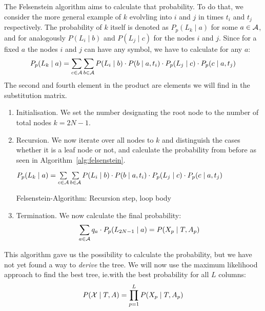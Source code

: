 The Felsenstein algorithm aims to calculate that probability.  To do that, we
consider the more general example of \(k\) evolvling into \(i\) and \(j\) in
times \(t_i\) and \(t_j\) respectively.  The probability of \(k\) itself is
denoted as \(P_p(L_k \mid a)\) for some \(a\in\mathcal{A}\), and for analogously
\(P(L_i \mid b)\) and \(P(L_j \mid c)\) for the nodes \(i\) and \(j\).  Since
for a fixed \(a\) the nodes \(i\) and \(j\) can have any symbol, we have to
calculate for any \(a\):
\[
  P_p(L_k \mid a) = \sum_{c\in\mathcal{A}} \sum_{b\in\mathcal{A}}
      P(L_i \mid b) \cdot P(b \mid a, t_i) \cdot P_p(L_j \mid c) \cdot P_p(c \mid a, t_j)
\]
The second and fourth element in the product are elements we will find in the
substitution matrix.


\begin{enumerate}[label=(\alph*)]
\item Initialisation.  We set the number designating the root node to the number
  of total nodes \(k = 2N-1\).
\item Recursion.  We now iterate over all nodes to \(k\) and distinguish
  the cases whether it is a leaf node or not, and calculate the probability
  from before as seen in Algorithm~\ref{alg:felsenstein}.


\AlgoDisplayBlockMarkers\SetAlgoNoLine%
\begin{algorithm}[ht]
 {
    $P_p(L_k \mid a) = \sum\limits_{c\in\mathcal{A}} \sum\limits_{b\in\mathcal{A}}
        P(L_i \mid b) \cdot P(b \mid a, t_i) \cdot P_p(L_j \mid c) \cdot P_p(c \mid a, t_j)$ \;
} 
\label{alg:felsenstein}
\caption{Felsenstein-Algorithm: Recursion step, loop body}
\end{algorithm}

\item Termination.  We now calculate the final probability:
  \[
    \sum_{a\in\mathcal{A}} q_a \cdot P_p(L_{2N-1} \mid a) = P(X_p \mid T, A_p)
  \]
\end{enumerate}
This algorithm gave us the possibility to calculate the probability, but we
have not yet found a way to \emph{derive} the tree.  We will now use the
maximum likelihood approach to find the best tree, ie.\@ with the best
probability for all \(L\) columns:
\[
  P(\mathcal{X} \mid T,A) = \prod_{p=1}^L P(X_p \mid T,A_p)
\]



